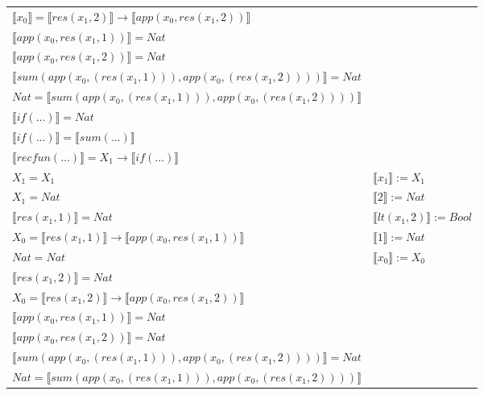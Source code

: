 \begin{exercise}
\begin{description}
\begin{center}
\begin{longtable}[!h]{ | l | l | }
                        $ \llbracket x_0 \rrbracket = \llbracket res(x_1,2) \rrbracket \to  \llbracket app(x_0, res(x_1,2)) \rrbracket$ & \\
                        $ \llbracket app(x_0, res(x_1,1)) \rrbracket = Nat$ & \\
                        $ \llbracket app(x_0, res(x_1,2)) \rrbracket = Nat$ & \\
                        $ \llbracket sum(app(x_0, (res(x_1,1))), app(x_0, (res(x_1,2))))  \rrbracket = Nat$ & \\
                        $Nat =  \llbracket sum(app(x_0, (res(x_1,1))), app(x_0, (res(x_1,2)))) \rrbracket$ & \\
                        $ \llbracket if(...) \rrbracket = Nat$ & \\
                        $ \llbracket if(...) \rrbracket =  \llbracket sum(...) \rrbracket$ & \\
                        $ \llbracket recfun(...) \rrbracket =   X_1  \to  \llbracket if(...) \rrbracket $  & \\
                    \hline
                        $X_1 = X_1$ & $ \llbracket x_1 \rrbracket := X_1$ \\
                        $X_1 = Nat$ & $ \llbracket 2 \rrbracket := Nat$ \\
                        $ \llbracket res(x_1,1) \rrbracket = Nat$ & $ \llbracket lt(x_1 , 2) \rrbracket := Bool$  \\
                        $X_0 =  \llbracket res(x_1,1) \rrbracket \to  \llbracket app(x_0, res(x_1,1)) \rrbracket$ &  $ \llbracket 1 \rrbracket := Nat$\\
                        $Nat = Nat$ & $ \llbracket x_0 \rrbracket := X_0$ \\
                        $ \llbracket res(x_1,2) \rrbracket = Nat$ & \\
                        $X_0 =  \llbracket res(x_1,2) \rrbracket \to  \llbracket app(x_0, res(x_1,2)) \rrbracket$ & \\
                        $ \llbracket app(x_0, res(x_1,1)) \rrbracket = Nat$ & \\
                        $ \llbracket app(x_0, res(x_1,2)) \rrbracket = Nat$ & \\
                        $ \llbracket sum(app(x_0, (res(x_1,1))), app(x_0, (res(x_1,2)))) \rrbracket = Nat$ & \\
                        $Nat =  \llbracket sum(app(x_0, (res(x_1,1))), app(x_0, (res(x_1,2)))) \rrbracket$ & \\

\end{longtable}
\end{center}
\end{description}
\end{exercise}
